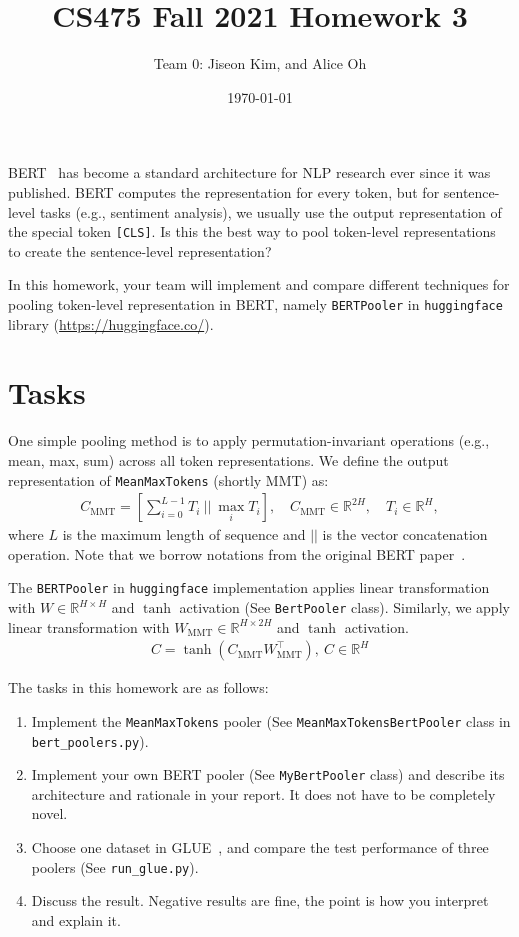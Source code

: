 \documentclass[UTF8]{article}
\title{CS475 Fall 2021 Homework 3}
\author{
  Team 0:  %
  Jiseon Kim, and Alice Oh  %
}
\date{\today}
\begin{document}
\maketitle

BERT~\cite{devlin-etal-2019-bert} has become a standard architecture for NLP research ever since it was published. BERT computes the representation for every token, but for sentence-level tasks (e.g., sentiment analysis), we usually use the output representation of the special token \texttt{[CLS]}. Is this the best way to pool token-level representations to create the sentence-level representation?

In this homework, your team will implement and compare different techniques for pooling token-level representation in BERT, namely \texttt{BERTPooler} in \texttt{huggingface} library (\url{https://huggingface.co/}).

\section{Tasks}

One simple pooling method is to apply permutation-invariant operations (e.g., mean, max, sum) across all token representations. We define the output representation of \texttt{MeanMaxTokens} (shortly MMT) as:
\begin{align}
  C_{\text{MMT}} = \left[
    \textstyle \sum_{i=0}^{L - 1} T_{i}\ ||\ \max_i T_{i}
  \right],\quad
   C_{\text{MMT}} \in \mathbb{R}^{2H},\quad
   T_i \in \mathbb{R}^{H},
\end{align}
where $L$ is the maximum length of sequence and $||$ is the vector concatenation operation. Note that we borrow notations from the original BERT paper~\cite{devlin-etal-2019-bert}. 

The \texttt{BERTPooler} in \texttt{huggingface} implementation applies linear transformation with $W \in \mathbb{R}^{H \times H}$ and $\tanh$ activation (See \texttt{BertPooler} class). Similarly, we apply linear transformation with $W_{\text{MMT}} \in \mathbb{R}^{H \times 2H}$ and $\tanh$ activation.
\begin{align}
  C = \tanh(C_{\text{MMT}}W_{\text{MMT}}^\top),\ C \in \mathbb{R}^{H}
\end{align}

The tasks in this homework are as follows:
\begin{enumerate}
  \item Implement the \texttt{MeanMaxTokens} pooler (See \texttt{MeanMaxTokensBertPooler} class in \texttt{bert\_poolers.py}).
  \item Implement your own BERT pooler (See \texttt{MyBertPooler} class) and describe its architecture and rationale in your report. It does not have to be completely novel.
  \item Choose one dataset in GLUE~\cite{wang2018glue}, and compare the test performance of three poolers (See \texttt{run\_glue.py}).
  \item Discuss the result. Negative results are fine, the point is how you interpret and explain it.
\end{enumerate}
\end{document}

